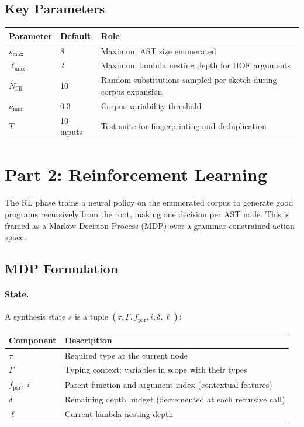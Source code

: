 \documentclass[11pt,a4paper]{article}
\begin{document}
\subsection{Key Parameters}\label{sec:params}

\begin{center}
\begin{tabular}{lll}
\toprule
Parameter & Default & Role \\
\midrule
$s_{\max}$            & 8         & Maximum AST size enumerated \\
$\ell_{\max}$         & 2         & Maximum lambda nesting depth for HOF arguments \\
$N_{\mathrm{fill}}$   & 10        & Random substitutions sampled per sketch during corpus expansion \\
$\nu_{\min}$          & 0.3       & Corpus variability threshold \\
$T$                   & 10 inputs & Test suite for fingerprinting and deduplication \\
\bottomrule
\end{tabular}
\end{center}

\section{Part 2: Reinforcement Learning}\label{sec:rl}

The RL phase trains a neural policy on the enumerated corpus to generate good programs
recursively from the root, making one decision per AST node. This is framed as a Markov
Decision Process (MDP) over a grammar-constrained action space.

\subsection{MDP Formulation}\label{sec:mdp}

\paragraph{State.}
A synthesis state $s$ is a tuple $(\tau, \Gamma, f_{\text{par}}, i, \delta, \ell)$:

\begin{center}
\begin{tabular}{ll}
\toprule
Component & Description \\
\midrule
$\tau$                  & Required type at the current node \\
$\Gamma$                & Typing context: variables in scope with their types \\
$f_{\text{par}},\ i$   & Parent function and argument index (contextual features) \\
$\delta$                & Remaining depth budget (decremented at each recursive call) \\
$\ell$                  & Current lambda nesting depth \\
\bottomrule
\end{tabular}
\end{center}
\end{document}

